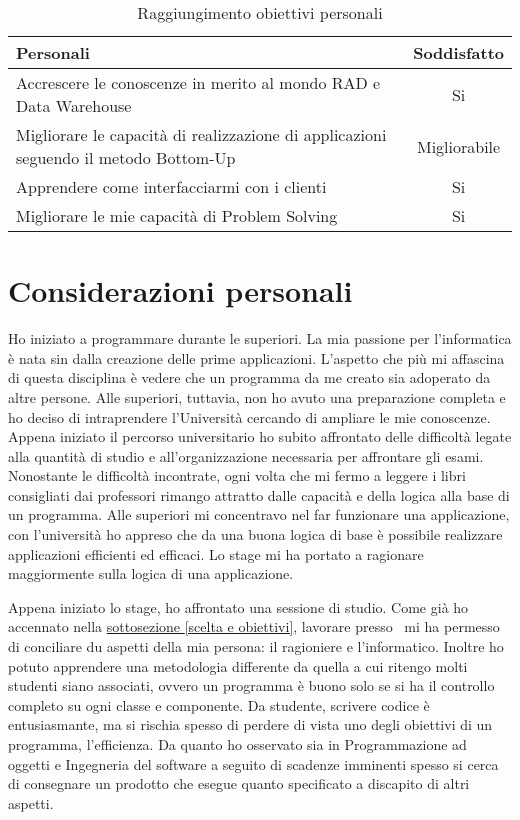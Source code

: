\begin{table}[h]
	\begin{tabular}{p{10cm}|c}
		\hline
		\textbf{Personali}& \textbf{Soddisfatto} \\
		\hline
		Accrescere le conoscenze in merito al mondo RAD e Data Warehouse & Si\\
		Migliorare le capacità di realizzazione di applicazioni seguendo il metodo Bottom-Up & Migliorabile\\
		Apprendere come interfacciarmi con i clienti & Si\\
		Migliorare le mie capacità di Problem Solving & Si

	\end{tabular}
\caption{Raggiungimento obiettivi personali}
\end{table}


\section{Considerazioni personali}
Ho iniziato a programmare durante le superiori. La mia passione per l'informatica è nata sin dalla creazione delle prime applicazioni. L'aspetto che più mi affascina di questa disciplina è vedere che un programma da me creato sia adoperato da altre persone. Alle superiori, tuttavia, non ho avuto una preparazione completa e ho deciso di intraprendere l'Università cercando di ampliare le mie conoscenze. Appena iniziato il percorso universitario ho subito affrontato delle difficoltà legate alla quantità di studio e all'organizzazione necessaria per affrontare gli esami. Nonostante le difficoltà incontrate, ogni volta che mi fermo a leggere i libri consigliati dai professori rimango attratto dalle capacità e della logica alla base di un programma. 
Alle superiori mi concentravo nel far funzionare una applicazione, con l'università ho appreso che da una buona logica di base è possibile realizzare applicazioni efficienti ed efficaci. Lo stage mi ha portato a ragionare maggiormente sulla logica di una applicazione.

Appena iniziato lo stage, ho affrontato una sessione di studio. Come già ho accennato nella \hyperref[scelta e obiettivi]{sottosezione \ref{scelta e obiettivi}}, lavorare presso \azienda\ mi ha permesso di conciliare du aspetti della mia persona: il ragioniere e l'informatico. Inoltre ho potuto apprendere una metodologia differente da quella a cui ritengo molti studenti siano associati, ovvero un programma è buono solo se si ha il controllo completo su ogni classe e componente. 
Da studente, scrivere codice è entusiasmante, ma si rischia spesso di perdere di vista uno degli obiettivi di un programma, l'efficienza. Da quanto ho osservato sia in Programmazione ad oggetti e Ingegneria del software a seguito di scadenze imminenti spesso si cerca di consegnare un prodotto che esegue quanto specificato a discapito di altri aspetti.

